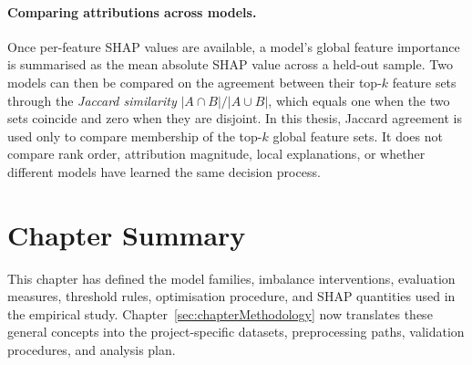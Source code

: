 \paragraph{Comparing attributions across models.}
Once per-feature SHAP values are available, a model's global feature
importance is summarised as the mean absolute SHAP value across a held-out
sample. Two models can then be compared on the agreement between their
top-$k$ feature sets through the \emph{Jaccard similarity}
$|A \cap B|/|A \cup B|$, which equals one when the two sets coincide and
zero when they are disjoint. In this thesis, Jaccard agreement is used only to
compare membership of the top-$k$ global feature sets. It does not compare rank
order, attribution magnitude, local explanations, or whether different models
have learned the same decision process.

\section{Chapter Summary}
\label{sec:tb:summary}

This chapter has defined the model families, imbalance interventions,
evaluation measures, threshold rules, optimisation procedure, and SHAP
quantities used in the empirical study. Chapter~\ref{sec:chapterMethodology}
now translates these general concepts into the project-specific datasets,
preprocessing paths, validation procedures, and analysis plan.
